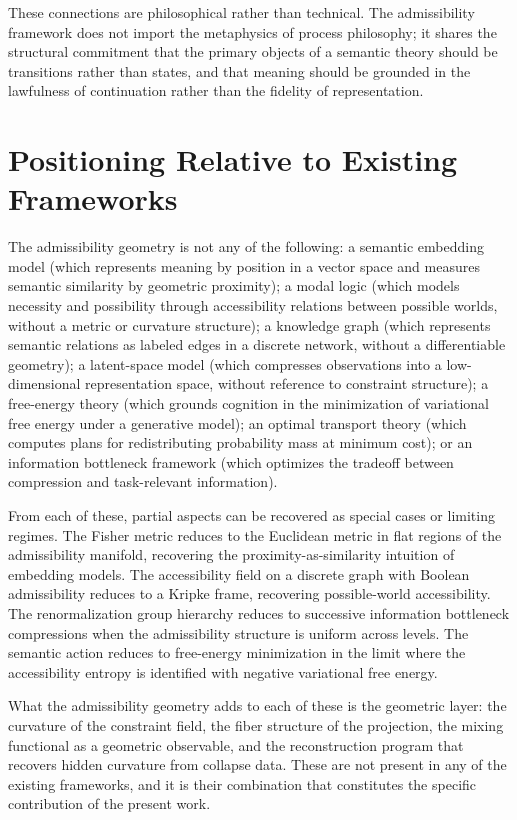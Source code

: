 \documentclass[12pt, oneside]{book}
\theoremstyle{plain-flyxion}
\theoremstyle{definition-flyxion}
\begin{document}
These connections are philosophical rather than technical. The admissibility framework
does not import the metaphysics of process philosophy; it shares the structural commitment
that the primary objects of a semantic theory should be transitions rather than states,
and that meaning should be grounded in the lawfulness of continuation rather than the
fidelity of representation.

\section{Positioning Relative to Existing Frameworks}

The admissibility geometry is not any of the following: a semantic embedding model
(which represents meaning by position in a vector space and measures semantic similarity
by geometric proximity); a modal logic (which models necessity and possibility through
accessibility relations between possible worlds, without a metric or curvature structure);
a knowledge graph (which represents semantic relations as labeled edges in a discrete
network, without a differentiable geometry); a latent-space model (which compresses
observations into a low-dimensional representation space, without reference to constraint
structure); a free-energy theory (which grounds cognition in the minimization of
variational free energy under a generative model); an optimal transport theory (which
computes plans for redistributing probability mass at minimum cost); or an information
bottleneck framework (which optimizes the tradeoff between compression and task-relevant
information).

From each of these, partial aspects can be recovered as special cases or limiting regimes.
The Fisher metric reduces to the Euclidean metric in flat regions of the admissibility
manifold, recovering the proximity-as-similarity intuition of embedding models. The
accessibility field on a discrete graph with Boolean admissibility reduces to a Kripke
frame, recovering possible-world accessibility. The renormalization group hierarchy
reduces to successive information bottleneck compressions when the admissibility structure
is uniform across levels. The semantic action reduces to free-energy minimization in the
limit where the accessibility entropy is identified with negative variational free energy.

What the admissibility geometry adds to each of these is the geometric layer: the
curvature of the constraint field, the fiber structure of the projection, the mixing
functional as a geometric observable, and the reconstruction program that recovers hidden
curvature from collapse data. These are not present in any of the existing frameworks,
and it is their combination that constitutes the specific contribution of the present work.
\end{document}
